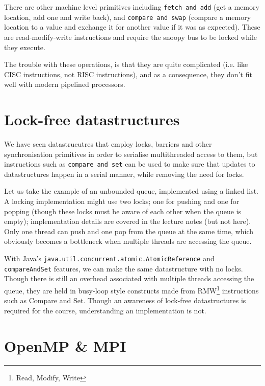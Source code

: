 There are other machine level primitives including \texttt{fetch and add} (get a
memory location, add one and write back), and \texttt{compare and swap} (compare
a memory location to a value and exchange it for another value if it was as
expected). These are read-modify-write instructions and require the snoopy bus
to be locked while they execute.

The trouble with these operations, is that they are quite complicated (i.e. like
CISC instructions, not RISC instructions), and as a consequence, they don't fit
well with modern pipelined processors.



\section{Lock-free datastructures}

We have seen datastrucutres that employ locks, barriers and other
synchronisation primitives in order to serialise multithreaded access
to them, but instructions such as \texttt{compare and set} can be used
to make sure that updates to datastructures happen in a serial manner,
while removing the need for locks.

Let us take the example of an unbounded queue, implemented using a
linked list. A locking implementation might use two locks; one for
pushing and one for popping (though these locks must be aware of each
other when the queue is empty); implementation details are covered in
the lecture notes (but not here). Only one thread can push and one pop
from the queue at the same time, which obviously becomes a bottleneck
when multiple threads are accessing the queue.

With Java's \texttt{java.util.concurrent.atomic.AtomicReference}
and \texttt{compareAndSet} features, we can make the same
datastructure with no locks. Though there is still an overhead
associated with multiple threads accessing the queue, they are held in
busy-loop style constructs made from RMW\footnote{Read, Modify, Write}
instructions such as Compare and Set. Though an awareness of lock-free
datastructures is required for the course, understanding an
implementation is not.


\section{OpenMP \& MPI}

